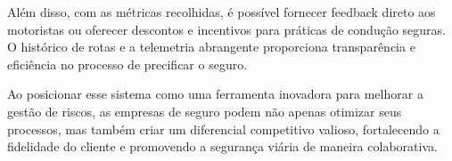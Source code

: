 Além disso, com as métricas recolhidas, é possível fornecer feedback direto aos motoristas ou oferecer descontos e incentivos para práticas de condução seguras. O histórico de rotas e a telemetria abrangente proporciona transparência e eficiência no processo de precificar o seguro. 

Ao posicionar esse sistema como uma ferramenta inovadora para melhorar a gestão de riscos, as empresas de seguro podem não apenas otimizar seus processos, mas também criar um diferencial competitivo valioso, fortalecendo a fidelidade do cliente e promovendo a segurança viária de maneira colaborativa.